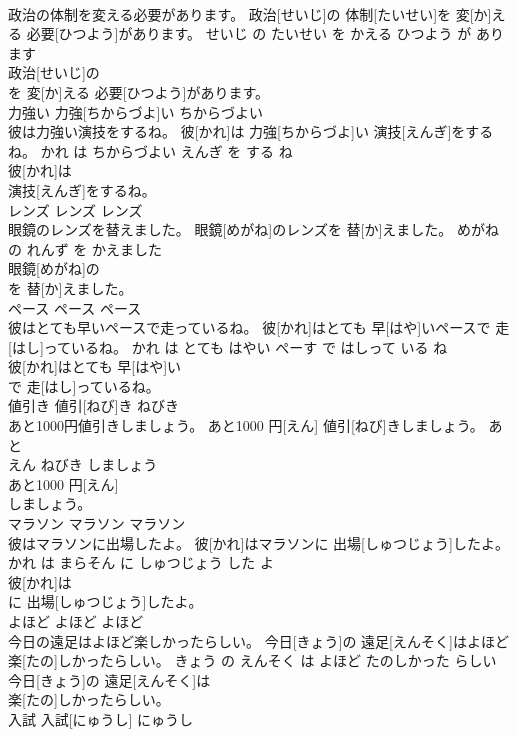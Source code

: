 \documentclass[8pt]{extreport}
\begin{document}
\begin{CJK}{UTF8}{min}
\\	政治の体制を変える必要があります。	政治[せいじ]の 体制[たいせい]を 変[か]える 必要[ひつよう]があります。	せいじ の たいせい を かえる ひつよう が あります	
\\	政治[せいじ]の
\\	を 変[か]える 必要[ひつよう]があります。			
\\	力強い	力強[ちからづよ]い	ちからづよい	
\\	彼は力強い演技をするね。	彼[かれ]は 力強[ちからづよ]い 演技[えんぎ]をするね。	かれ は ちからづよい えんぎ を する ね	
\\	彼[かれ]は
\\	演技[えんぎ]をするね。			
\\	レンズ	レンズ	レンズ	
\\	眼鏡のレンズを替えました。	眼鏡[めがね]のレンズを 替[か]えました。	めがね の れんず を かえました	
\\	眼鏡[めがね]の
\\	を 替[か]えました。			
\\	ペース	ペース	ペース	
\\	彼はとても早いペースで走っているね。	彼[かれ]はとても 早[はや]いペースで 走[はし]っているね。	かれ は とても はやい ぺーす で はしって いる ね	
\\	彼[かれ]はとても 早[はや]い
\\	で 走[はし]っているね。			
\\	値引き	値引[ねび]き	ねびき	
\\	あと1000円値引きしましょう。	あと1000 円[えん] 値引[ねび]きしましょう。	あと 
\\	えん ねびき しましょう	
\\	あと1000 円[えん]
\\	しましょう。			
\\	マラソン	マラソン	マラソン	
\\	彼はマラソンに出場したよ。	彼[かれ]はマラソンに 出場[しゅつじょう]したよ。	かれ は まらそん に しゅつじょう した よ	
\\	彼[かれ]は
\\	に 出場[しゅつじょう]したよ。			
\\	よほど	よほど	よほど	
\\	今日の遠足はよほど楽しかったらしい。	今日[きょう]の 遠足[えんそく]はよほど 楽[たの]しかったらしい。	きょう の えんそく は よほど たのしかった らしい	
\\	今日[きょう]の 遠足[えんそく]は
\\	楽[たの]しかったらしい。			
\\	入試	入試[にゅうし]	にゅうし	

\end{CJK}
\end{document}
